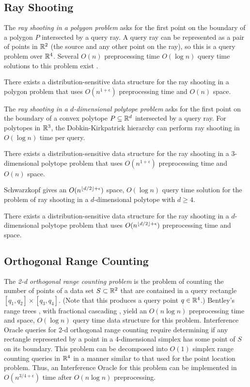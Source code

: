 \documentclass{patmorin}
\begin{document}
\subsection{Ray Shooting}

The \emph{ray shooting in a polygon problem} asks for the first point
on the boundary of a polygon $P$ intersected by a query ray.  A query
ray can be represented as a pair of points in $\mathbb{R}^2$ (the source and
any other point on the ray), so this is a query problem over $\mathbb{R}^4$.
Several $O(n)$ preprocessing time $O(\log n)$ query time solutions to
this problem exist \cite{cegghss94,hs95}.

\begin{thm}
  There exists a distribution-sensitive data structure for the ray shooting
  in a polygon problem that uses $O(n^{1+\epsilon})$ preprocessing time and
  $O(n)$ space.
\end{thm}

The \emph{ray shooting in a $d$-dimensional polytope problem}
asks for the first point on the boundary of a convex polytope
$P\subseteq\mathbb{R}^d$ intersected by a query ray.  For polytopes in $\mathbb{R}^3$,
the Dobkin-Kirkpatrick hierarchy \cite{dk83} can perform ray shooting
in $O(\log n)$ time per query.

\begin{thm}
  There exists a distribution-sensitive data structure for the
  ray shooting in a $3$-dimensional polytope problem that uses
  $O(n^{1+\epsilon})$ preprocessing time and $O(n)$ space.
\end{thm}

Schwarzkopf \cite{s92} gives an $O(n^{{\lfloor d/2 \rfloor}+\epsilon})$ space,
$O(\log n)$ query time solution for the problem of ray shooting in a
$d$-dimensional polytope with $d \ge 4$.

\begin{thm}
  There exists a distribution-sensitive data structure for the
  ray shooting in a $d$-dimensional polytope problem that uses
  $O(n^{{\lfloor d/2 \rfloor}+\epsilon})$ preprocessing time and space.
\end{thm}

\subsection{Orthogonal Range Counting}

The \emph{2-d orthogonal range counting problem} is the problem
of counting the number of points of a data set $S\subset\mathbb{R}^2$ that
are contained in a query rectangle $[q_1,q_2]\times[q_3,q_4]$. (Note
that this produces a query point $q\in \mathbb{R}^4$.) Bentley's range trees
\cite{b75}, with fractional cascading \cite{cg86,l78}, yield an $O(n\log
n)$ preprocessing time and space, $O(\log n)$ query time data structure
for this problem.  Interference Oracle queries for 2-d orthogonal
range counting require determining if any rectangle represented by a
point in a 4-dimensional simplex has some point of $S$ on its boundary.
This problem can be decomposed into $O(1)$ simplex range counting queries
in $\mathbb{R}^4$ in a manner similar to that used for the point location problem.
Thus, an Interference Oracle for this problem can be implemented in
$O(n^{3/4+\epsilon})$ time after $O(n\log n)$ preprocessing.
\end{document}
